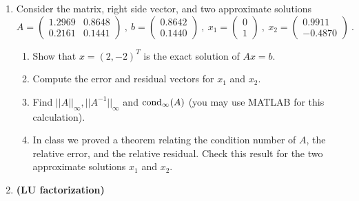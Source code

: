 \documentclass [12pt]{article}
\begin{document}
\begin{enumerate}
\item
 Consider the matrix, right side vector,
and two approximate solutions
$$
A=\begin{pmatrix}
            1.2969& 0.8648 \\
            0.2161& 0.1441
   \end{pmatrix} ~,~
b=\begin{pmatrix}
            0.8642 \\
            0.1440
   \end{pmatrix} ~,~
x_1 =\begin{pmatrix}
               0 \\
               1
   \end{pmatrix} ~,~
x_2 =\begin{pmatrix}
               0.9911 \\
               -0.4870
   \end{pmatrix} ~.
$$

\begin{enumerate}

\item
Show that $x=(2,-2)^T$ is the exact solution of $Ax=b$.

\item
Compute the error and residual vectors for
$x_1$ and $x_2$.

\item
Find $||A||_\infty , ||A^{-1}||_\infty$
and $\hbox{cond}_\infty (A)$ (you may use MATLAB for this calculation).

\item
In class we proved a theorem relating
the condition number of $A$,
the relative error,
and the relative residual.
Check this result for the two approximate solutions
$x_1$ and $x_2$.


\end{enumerate}


\item \textbf{(LU factorization)}


\end{enumerate}
\end{document}
